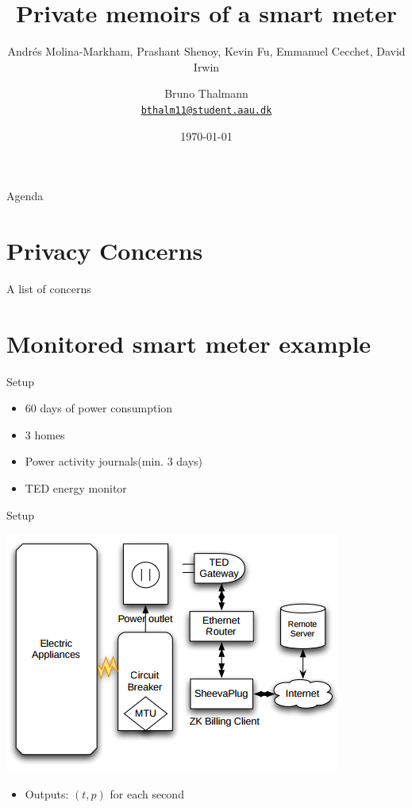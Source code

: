 \documentclass[10pt]{beamer}
\title{Private memoirs of a smart meter}
\subtitle{Andrés Molina-Markham, Prashant Shenoy, Kevin Fu, Emmanuel Cecchet, David Irwin}  %
\date{\today}
\author{
  Bruno Thalmann\\
  \href{mailto:bthalm11@student.aau.dk}{{\tt bthalm11@student.aau.dk}}
}
\institute[
  Dept.\ of Computer Science\\
  Aalborg University\\
  Denmark
] %
{%
  Department of Computer Science\\
  Aalborg University\\
  Denmark
  
}
\begin{document}
{\aauwavesbg%
\begin{frame} %
  \titlepage
\end{frame}}

\begin{frame}{Agenda}{}
\tableofcontents
\end{frame}

\section{Privacy Concerns}
\begin{frame}{A list of concerns}{}
\end{frame}

\section{Monitored smart meter example}
\begin{frame}{Setup}
  \begin{itemize}
    \itemsep2em 
    \item 60 days of power consumption
    \item 3 homes
    \item Power activity journals(min. 3 days)
    \item TED energy monitor
    \end{itemize}
\end{frame}

\begin{frame}{Setup}
  \begin{center}
  \includegraphics[scale=.5]{graphics/TED_architecture.png}  
  \end{center}
  \begin{itemize}
  \item Outputs: $(t,p)$ for each second
  \end{itemize}
\end{frame}
\end{document}
